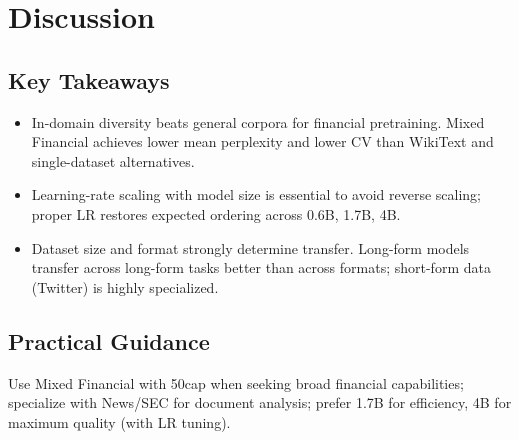 \chapter{Discussion}

\section{Key Takeaways}
\begin{itemize}
  \item In-domain diversity beats general corpora for financial pretraining. Mixed Financial achieves lower mean perplexity and lower CV than WikiText and single-dataset alternatives.
  \item Learning-rate scaling with model size is essential to avoid reverse scaling; proper LR restores expected ordering across 0.6B, 1.7B, 4B.
  \item Dataset size and format strongly determine transfer. Long-form models transfer across long-form tasks better than across formats; short-form data (Twitter) is highly specialized.
\end{itemize}

\section{Practical Guidance}
Use Mixed Financial with 50cap when seeking broad financial capabilities; specialize with News/SEC for document analysis; prefer 1.7B for efficiency, 4B for maximum quality (with LR tuning).

